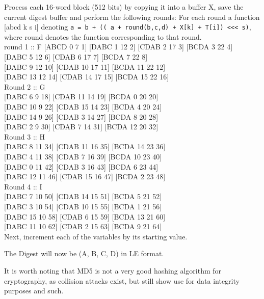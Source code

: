 \documentclass[a4paper]{article}
\begin{document}
Process each 16-word block (512 bits) by copying it into a buffer X,
save the current digest buffer and perform the following rounds:
For each round a function [abcd k s i] denoting \texttt{a = b + (( a + round(b,c,d) + X[k] + T[i]) <<< s)}, where round denotes the function corresponding to that round.\\
round 1  :: F
[ABCD  0  7  1]  [DABC  1 12  2]  [CDAB  2 17  3]  [BCDA  3 22  4]\\
[ABCD  4  7  5]  [DABC  5 12  6]  [CDAB  6 17  7]  [BCDA  7 22  8]\\
[ABCD  8  7  9]  [DABC  9 12 10]  [CDAB 10 17 11]  [BCDA 11 22 12]\\
[ABCD 12  7 13]  [DABC 13 12 14]  [CDAB 14 17 15]  [BCDA 15 22 16]\\
Round 2 :: G\\
[ABCD  1  5 17]  [DABC  6  9 18]  [CDAB 11 14 19]  [BCDA  0 20 20]\\
[ABCD  5  5 21]  [DABC 10  9 22]  [CDAB 15 14 23]  [BCDA  4 20 24]\\
[ABCD  9  5 25]  [DABC 14  9 26]  [CDAB  3 14 27]  [BCDA  8 20 28]\\
[ABCD 13  5 29]  [DABC  2  9 30]  [CDAB  7 14 31]  [BCDA 12 20 32]\\
Round 3 :: H\\
[ABCD  5  4 33]  [DABC  8 11 34]  [CDAB 11 16 35]  [BCDA 14 23 36]\\
[ABCD  1  4 37]  [DABC  4 11 38]  [CDAB  7 16 39]  [BCDA 10 23 40]\\
[ABCD 13  4 41]  [DABC  0 11 42]  [CDAB  3 16 43]  [BCDA  6 23 44]\\
[ABCD  9  4 45]  [DABC 12 11 46]  [CDAB 15 16 47]  [BCDA  2 23 48]\\
Round 4 :: I\\
[ABCD  0  6 49]  [DABC  7 10 50]  [CDAB 14 15 51]  [BCDA  5 21 52]\\
[ABCD 12  6 53]  [DABC  3 10 54]  [CDAB 10 15 55]  [BCDA  1 21 56]\\
[ABCD  8  6 57]  [DABC 15 10 58]  [CDAB  6 15 59]  [BCDA 13 21 60]\\
[ABCD  4  6 61]  [DABC 11 10 62]  [CDAB  2 15 63]  [BCDA  9 21 64]\\
Next, increment each of the variables by its starting value.

The Digest will now be (A, B, C, D) in LE format.

It is worth noting that MD5 is not a very good hashing algorithm for cryptography, as collision attacks exist, but still show use for data integrity purposes and such.
\end{document}
